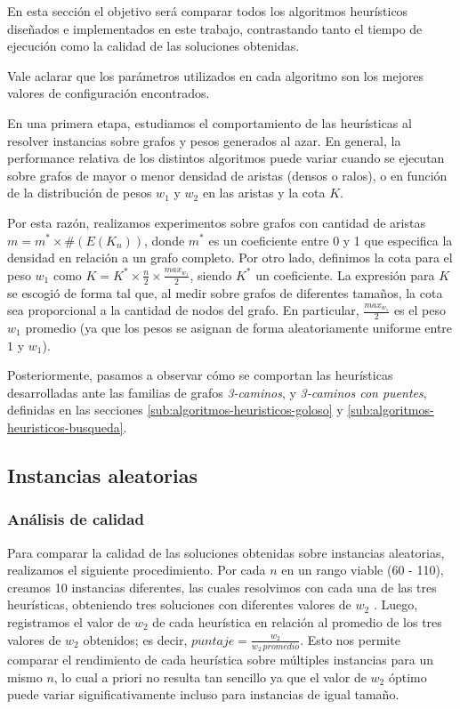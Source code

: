 En esta sección el objetivo será comparar todos los algoritmos heurísticos diseñados e implementados en este trabajo, contrastando tanto el tiempo de ejecución como la calidad de las soluciones obtenidas.

Vale aclarar que los parámetros utilizados en cada algoritmo son los mejores valores de configuración encontrados.

En una primera etapa, estudiamos el comportamiento de las heurísticas al resolver instancias sobre grafos y pesos generados al azar. En general, la performance relativa de los distintos algoritmos puede variar cuando se ejecutan sobre grafos de mayor o menor densidad de aristas (densos o ralos), o en función de la distribución de pesos $w_1$ y $w_2$ en las aristas y la cota $K$.

Por esta razón, realizamos experimentos sobre grafos con cantidad de aristas $m = m^* \times \#(E(K_n))$, donde $m^*$ es un coeficiente entre 0 y 1 que especifica la densidad en relación a un grafo completo. Por otro lado, definimos la cota para el peso $w_1$ como $K = K^* \times \frac{n}{2} \times \frac{max_{w_1}}{2}$, siendo $K^*$ un coeficiente. La expresión para $K$ se escogió de forma tal que, al medir sobre grafos de diferentes tamaños, la cota sea proporcional a la cantidad de nodos del grafo. En particular, $\frac{max_{w_1}}{2}$ es el peso $w_1$ promedio (ya que los pesos se asignan de forma aleatoriamente uniforme entre $1$ y $w_1$).

Posteriormente, pasamos a observar cómo se comportan las heurísticas desarrolladas ante las familias de grafos \emph{3-caminos}, y \emph{3-caminos con puentes}, definidas en las secciones \ref{sub:algoritmos-heuristicos-goloso} y \ref{sub:algoritmos-heuristicos-busqueda}.

\subsection{Instancias aleatorias}

\subsubsection{Análisis de calidad}

Para comparar la calidad de las soluciones obtenidas sobre instancias aleatorias, realizamos el siguiente procedimiento.
Por cada $n$ en un rango viable (60 - 110), creamos 10 instancias diferentes, las cuales resolvimos con cada una de las tres heurísticas, obteniendo tres soluciones con diferentes valores de $w_2$ . Luego, registramos el valor de $w_2$ de cada heurística en relación al promedio de los tres valores de $w_2$ obtenidos; es decir, $puntaje = \frac{w_2}{w_2 \, promedio}$. Esto nos permite comparar el rendimiento de cada heurística sobre múltiples instancias para un mismo $n$, lo cual a priori no resulta tan sencillo ya que el valor de $w_2$ óptimo puede variar significativamente incluso para instancias de igual tamaño.

